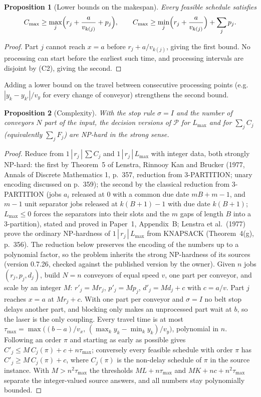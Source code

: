 \documentclass[11pt,a4paper]{article}
\newtheorem{proposition}{Proposition}
\theoremstyle{definition}
\theoremstyle{remark}
\newcommand{\Pb}{\mathcal{P}}
\begin{document}
\begin{proposition}[Lower bounds on the makespan]
Every feasible schedule satisfies
\[
C_{\max}\ge\max_j\Bigl(r_j+\frac{a}{v_{k(j)}}+p_j\Bigr),\qquad
C_{\max}\ge\min_j\Bigl(r_j+\frac{a}{v_{k(j)}}\Bigr)+\sum_j p_j .
\]
\end{proposition}
\begin{proof}
Part $j$ cannot reach $x=a$ before $r_j+a/v_{k(j)}$, giving the first bound. No
processing can start before the earliest such time, and processing intervals are
disjoint by (C2), giving the second.
\end{proof}
Adding a lower bound on the travel between consecutive processing points (e.g.\
$|y_k-y_{k'}|/v_y$ for every change of conveyor) strengthens the second bound.

\begin{proposition}[Complexity]
With the stop rule $\sigma=I$ and the number of conveyors $N$ part of the input, the
decision versions of $\Pb$ for $L_{\max}$ and for $\sum_jC_j$ (equivalently $\sum_jF_j$)
are NP-hard in the strong sense.
\end{proposition}
\begin{proof}
Reduce from $1\,|\,r_j\,|\,\sum C_j$ and $1\,|\,r_j\,|\,L_{\max}$ with integer data,
both strongly NP-hard: the first by Theorem~5 of Lenstra, Rinnooy Kan and Brucker
(1977, Annals of Discrete Mathematics 1, p.~357, reduction from 3-PARTITION; unary
encoding discussed on p.~359); the second by the classical reduction from 3-PARTITION
(jobs $a_i$ released at $0$ with a common due date $mB+m-1$, and $m-1$ unit separator
jobs released at $k(B+1)-1$ with due date $k(B+1)$; $L_{\max}\le0$ forces the
separators into their slots and the $m$ gaps of length $B$ into a 3-partition), stated
and proved in Paper~1, Appendix~B; Lenstra et al.\ (1977) prove the ordinary
NP-hardness of $1\,|\,r_j\,|\,L_{\max}$ from KNAPSACK (Theorem~4(g), p.~356). The
reduction below preserves the encoding of the numbers up to a polynomial factor, so the
problem inherits the strong NP-hardness of its sources (version 0.7.26, checked against
the published version by the owner). Given $n$ jobs $(r_j,p_j,d_j)$,
build $N=n$ conveyors of equal speed $v$, one part per conveyor, and scale by an integer
$M$: $r'_j=Mr_j$, $p'_j=Mp_j$, $d'_j=Md_j+c$ with $c=a/v$. Part $j$ reaches $x=a$ at
$Mr_j+c$. With one part per conveyor and $\sigma=I$ no belt stop delays another part, and
blocking only makes an unprocessed part wait at $b$, so the laser is the only coupling.
Every travel time is at most
$\tau_{\max}=\max\bigl((b-a)/v_x,\,(\max_ky_k-\min_ky_k)/v_y\bigr)$, polynomial in $n$.
Following an order $\pi$ and starting as early as possible gives
$C'_j\le M\,C_j(\pi)+c+n\tau_{\max}$; conversely every feasible schedule with order
$\pi$ has $C'_j\ge M\,C_j(\pi)+c$, where $C_j(\pi)$ is the non-delay schedule of $\pi$ in
the source instance. With $M>n^2\tau_{\max}$ the thresholds $ML+n\tau_{\max}$ and
$MK+nc+n^2\tau_{\max}$ separate the integer-valued source answers, and all numbers stay
polynomially bounded.
\end{proof}
\end{document}
